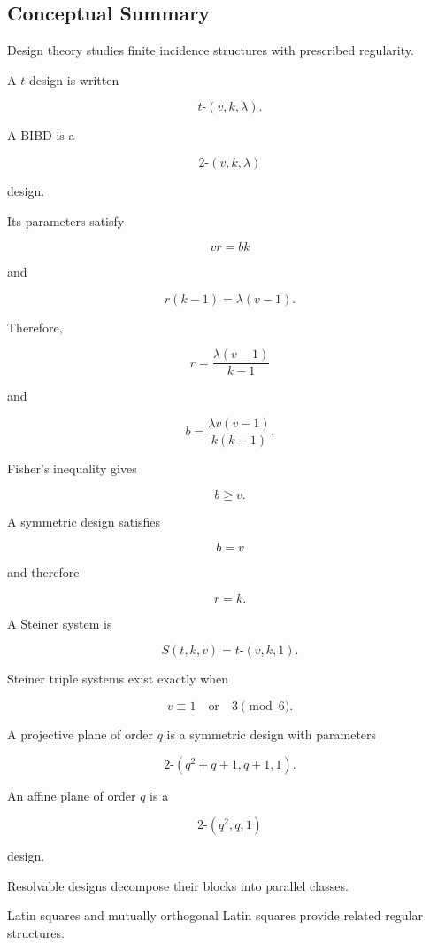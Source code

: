 \subsection{Conceptual Summary}
\label{subsec:design-theory-summary}

Design theory studies finite incidence structures with prescribed
regularity.

A \(t\)-design is written

\[
\boxed{
t\text{-}(v,k,\lambda).
}
\]

A BIBD is a

\[
\boxed{
2\text{-}(v,k,\lambda)
}
\]

design.

Its parameters satisfy

\[
\boxed{
vr=bk
}
\]

and

\[
\boxed{
r(k-1)
=
\lambda(v-1).
}
\]

Therefore,

\[
\boxed{
r
=
\frac{\lambda(v-1)}{k-1}
}
\]

and

\[
\boxed{
b
=
\frac{\lambda v(v-1)}
{k(k-1)}.
}
\]

Fisher's inequality gives

\[
\boxed{
b\geq v.
}
\]

A symmetric design satisfies

\[
\boxed{
b=v
}
\]

and therefore

\[
\boxed{
r=k.
}
\]

A Steiner system is

\[
\boxed{
S(t,k,v)
=
t\text{-}(v,k,1).
}
\]

Steiner triple systems exist exactly when

\[
\boxed{
v\equiv1
\quad\text{or}\quad
3
\pmod6.
}
\]

A projective plane of order \(q\) is a symmetric design with parameters

\[
\boxed{
2\text{-}(q^2+q+1,q+1,1).
}
\]

An affine plane of order \(q\) is a

\[
\boxed{
2\text{-}(q^2,q,1)
}
\]

design.

Resolvable designs decompose their blocks into parallel classes.

Latin squares and mutually orthogonal Latin squares provide related
regular structures.

